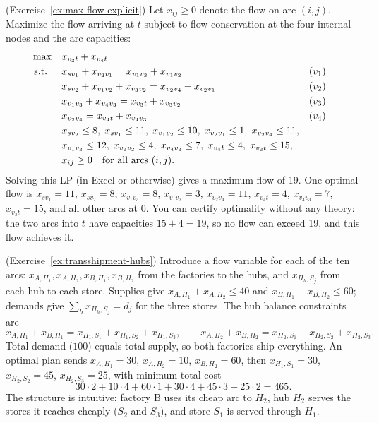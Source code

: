 \begin{solution}(Exercise~\ref{ex:max-flow-explicit})
Let $x_{ij} \geq 0$ denote the flow on arc $(i,j)$.  Maximize the flow arriving at $t$ subject to flow conservation at the four internal nodes and the arc capacities:
\begin{align*}
\max \quad & x_{v_3 t} + x_{v_4 t}\\
\mbox{ s.t. } \quad & x_{s v_1} + x_{v_2 v_1} = x_{v_1 v_3} + x_{v_1 v_2} && (v_1)\\
& x_{s v_2} + x_{v_1 v_2} + x_{v_3 v_2} = x_{v_2 v_4} + x_{v_2 v_1} && (v_2)\\
& x_{v_1 v_3} + x_{v_4 v_3} = x_{v_3 t} + x_{v_3 v_2} && (v_3)\\
& x_{v_2 v_4} = x_{v_4 t} + x_{v_4 v_3} && (v_4)\\
& x_{s v_2} \leq 8, \; x_{s v_1} \leq 11, \; x_{v_1 v_2} \leq 10, \; x_{v_2 v_1} \leq 1, \; x_{v_2 v_4} \leq 11,\\
& x_{v_1 v_3} \leq 12, \; x_{v_3 v_2} \leq 4, \; x_{v_4 v_3} \leq 7, \; x_{v_4 t} \leq 4, \; x_{v_3 t} \leq 15,\\
& x_{ij} \geq 0 \quad \mbox{for all arcs } (i,j).
\end{align*}
Solving this LP (in Excel or otherwise) gives a maximum flow of 19.  One optimal flow is $x_{s v_1} = 11$, $x_{s v_2} = 8$, $x_{v_1 v_3} = 8$, $x_{v_1 v_2} = 3$, $x_{v_2 v_4} = 11$, $x_{v_4 t} = 4$, $x_{v_4 v_3} = 7$, $x_{v_3 t} = 15$, and all other arcs at 0.  You can certify optimality without any theory: the two arcs into $t$ have capacities $15 + 4 = 19$, so no flow can exceed 19, and this flow achieves it.
\end{solution}

\begin{solution}(Exercise~\ref{ex:transshipment-hubs})
Introduce a flow variable for each of the ten arcs: $x_{A,H_1}, x_{A,H_2}, x_{B,H_1}, x_{B,H_2}$ from the factories to the hubs, and $x_{H_h,S_j}$ from each hub to each store.  Supplies give $x_{A,H_1} + x_{A,H_2} \leq 40$ and $x_{B,H_1} + x_{B,H_2} \leq 60$; demands give $\sum_h x_{H_h,S_j} = d_j$ for the three stores.  The hub balance constraints are
\[
x_{A,H_1} + x_{B,H_1} = x_{H_1,S_1} + x_{H_1,S_2} + x_{H_1,S_3}, \qquad
x_{A,H_2} + x_{B,H_2} = x_{H_2,S_1} + x_{H_2,S_2} + x_{H_2,S_3}.
\]
Total demand ($100$) equals total supply, so both factories ship everything.  An optimal plan sends $x_{A,H_1} = 30$, $x_{A,H_2} = 10$, $x_{B,H_2} = 60$, then $x_{H_1,S_1} = 30$, $x_{H_2,S_2} = 45$, $x_{H_2,S_3} = 25$, with minimum total cost
\[
30 \cdot 2 + 10 \cdot 4 + 60 \cdot 1 + 30 \cdot 4 + 45 \cdot 3 + 25 \cdot 2 = 465.
\]
The structure is intuitive: factory B uses its cheap arc to $H_2$, hub $H_2$ serves the stores it reaches cheaply ($S_2$ and $S_3$), and store $S_1$ is served through $H_1$.
\end{solution}

